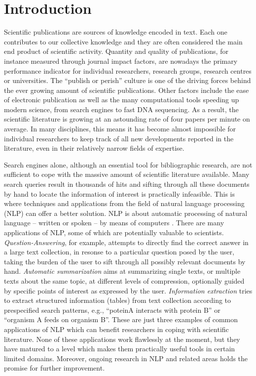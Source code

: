 
\chapter{Introduction}

Scientific publications are sources of knowledge encoded in text.
Each one contributes to our collective knowledge and they are often considered the main end product of scientific activity.
Quantity and quality of publications, for instance measured through journal impact factors, are nowadays the primary performance indicator for individual researchers, research groups, research centres or universities.  
The ``publish or perish'' culture is one of the driving forces behind the ever growing amount of scientific publications.
Other factors include the ease of electronic publication as well as the many computational tools speeding up modern science, from search engines to fast DNA sequencing.
As a result, the scientific literature is growing at an astounding rate of four papers per minute on average.
In many disciplines, this means it has become almost impossible for individual researchers to keep track of all new developments reported in the literature, even in their relatively narrow fields of expertise.

Search engines alone, although an essential tool for bibliographic research, are not sufficient to cope with the massive amount of scientific literature available.
Many search queries result in thousands of hits and sifting through all these documents by hand to locate the information of interest is practically infeasible.
This is where techniques and applications from the field of natural language processing (NLP) can offer a better solution.
NLP is about automatic processing of natural language -- written or spoken -- by means of computers \citep{jurafsky2000speech,manning1999foundations}.
There are many applications of NLP, some of which are potentially valuable to scientists.   
\emph{Question-Answering}, for example, attempts to directly find the correct answer in a large text collection, in resonse to a particular question posed by the user, taking the burden of the user to sift through all possibly relevant documents by hand.
\emph{Automatic summarization} aims at summarizing single texts, or multiple texts about the same topic, at different levels of compression, optionally guided by specific points of interest as expressed by the user.
\emph{Information extraction} tries to extract structured information (tables) from text collection according to prespecified search patterns, e.g., ``poteinA interacts with protein B'' or ``organism A feeds on organism B''.
These are just three examples of common applications of NLP which can benefit researchers in coping with scientific literature.
None of these applications work flawlessly at the moment, but they have matured to a level which makes them practically useful tools in certain limited domains.
Moreover, ongoing research in NLP and related areas holds the promise for further improvement.
  
